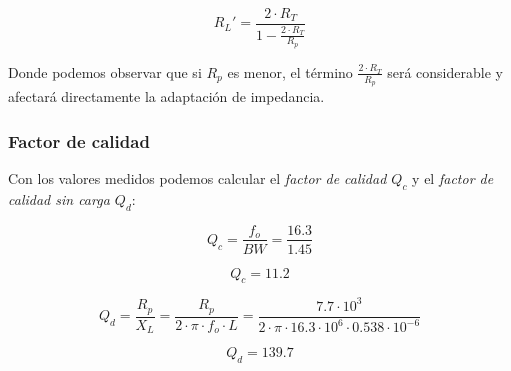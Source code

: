 \begin{equation}
    R_L' = \frac{2 \cdot R_T}{1 - \frac{2 \cdot R_T}{R_p}}
\end{equation}

Donde podemos observar que si $R_p$ es menor, el término $\frac{2 \cdot R_T}{R_p}$ será considerable y afectará directamente la adaptación de impedancia. 

\subsubsection{Factor de calidad}

Con los valores medidos podemos calcular el \textit{factor de calidad $Q_c$} y el \textit{factor de calidad sin carga $Q_d$}:

\begin{equation}
    Q_c = \frac{f_o}{BW} = \frac{16.3}{1.45}
\end{equation}

\begin{equation}
    \boxed{Q_c = 11.2}
\end{equation}

\begin{equation}
    Q_d = \frac{R_p}{X_L} = \frac{R_p}{2 \cdot \pi \cdot f_o \cdot L} = \frac{7.7 \cdot 10^3}{2 \cdot \pi \cdot 16.3 \cdot 10^6 \cdot 0.538 \cdot 10^{-6}}
\end{equation}

\begin{equation}
    \boxed{Q_d = 139.7}
\end{equation}



